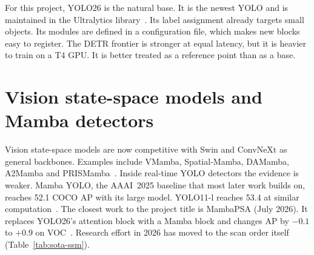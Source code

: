 

For this project, YOLO26 is the natural base. It is the newest YOLO and is
maintained in the Ultralytics library~\citep{yolo26_2026}. Its label
assignment already targets small objects. Its modules are defined in a
configuration file, which makes new blocks easy to register. The DETR
frontier is stronger at equal latency, but it is heavier to train on a T4
GPU. It is better treated as a reference point than as a base.

\section{Vision state-space models and Mamba detectors}
\label{sec:sota-ssm}

Vision state-space models are now competitive with Swin and ConvNeXt as
general backbones. Examples include VMamba, Spatial-Mamba, DAMamba,
A2Mamba and PRISMamba~\citep{liu2024vmamba,xiao2025spatialmamba,damamba2025,a2mamba2025,prismamba2026}.
Inside real-time YOLO detectors the evidence is weaker. Mamba YOLO, the
AAAI~2025 baseline that most later work builds on, reaches 52.1 COCO AP with
its large model. YOLO11-l reaches 53.4 at similar
computation~\citep{wang2025mambayolo,yolo11_2024}. The closest work to the
project title is MambaPSA (July 2026). It replaces YOLO26's attention block
with a Mamba block and changes AP by $-0.1$ to $+0.9$ on
VOC~\citep{mambapsa2026}. Research effort in 2026 has moved to the scan
order itself (Table~\ref{tab:sota-ssm}).

